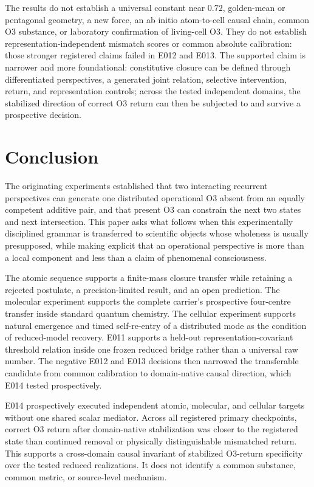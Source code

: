 \documentclass[11pt,a4paper]{article}
\begin{document}
The results do not establish a universal constant near $0.72$, golden-mean or pentagonal geometry, a new force, an ab initio atom-to-cell causal chain, common O3 substance, or laboratory confirmation of living-cell O3. They do not establish representation-independent mismatch scores or common absolute calibration: those stronger registered claims failed in E012 and E013. The supported claim is narrower and more foundational: constitutive closure can be defined through differentiated perspectives, a generated joint relation, selective intervention, return, and representation controls; across the tested independent domains, the stabilized direction of correct O3 return can then be subjected to and survive a prospective decision.

\section{Conclusion}

The originating experiments established that two interacting recurrent perspectives can generate one distributed operational O3 absent from an equally competent additive pair, and that present O3 can constrain the next two states and next intersection. This paper asks what follows when this experimentally disciplined grammar is transferred to scientific objects whose wholeness is usually presupposed, while making explicit that an operational perspective is more than a local component and less than a claim of phenomenal consciousness.

The atomic sequence supports a finite-mass closure transfer while retaining a rejected postulate, a precision-limited result, and an open prediction. The molecular experiment supports the complete carrier's prospective four-centre transfer inside standard quantum chemistry. The cellular experiment supports natural emergence and timed self-re-entry of a distributed mode as the condition of reduced-model recovery. E011 supports a held-out representation-covariant threshold relation inside one frozen reduced bridge rather than a universal raw number. The negative E012 and E013 decisions then narrowed the transferable candidate from common calibration to domain-native causal direction, which E014 tested prospectively.

E014 prospectively executed independent atomic, molecular, and cellular targets without one shared scalar mediator. Across all registered primary checkpoints, correct O3 return after domain-native stabilization was closer to the registered state than continued removal or physically distinguishable mismatched return. This supports a cross-domain causal invariant of stabilized O3-return specificity over the tested reduced realizations. It does not identify a common substance, common metric, or source-level mechanism.
\end{document}
